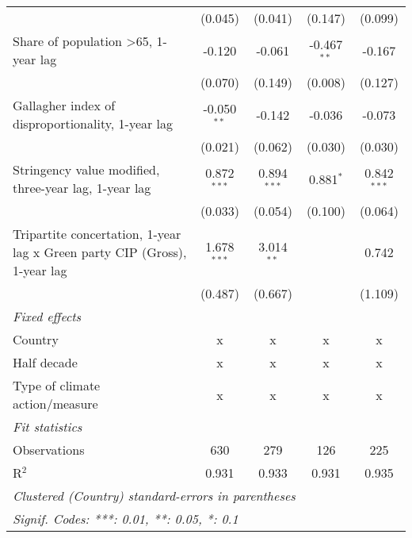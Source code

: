 \begin{table}[htbp]
\begin{tabular}{lcccc}
                                                                                & (0.045)       & (0.041)         & (0.147)         & (0.099)\\   
      Share of population >65, 1-year lag                                       & -0.120        & -0.061          & -0.467$^{**}$   & -0.167\\   
                                                                                & (0.070)       & (0.149)         & (0.008)         & (0.127)\\   
      Gallagher index of disproportionality, 1-year lag                         & -0.050$^{**}$ & -0.142          & -0.036          & -0.073\\   
                                                                                & (0.021)       & (0.062)         & (0.030)         & (0.030)\\   
      Stringency value modified, three-year lag, 1-year lag                     & 0.872$^{***}$ & 0.894$^{***}$   & 0.881$^{*}$     & 0.842$^{***}$\\   
                                                                                & (0.033)       & (0.054)         & (0.100)         & (0.064)\\   
      Tripartite concertation, 1-year lag x Green party CIP (Gross), 1-year lag & 1.678$^{***}$ & 3.014$^{**}$    &                 & 0.742\\   
                                                                                & (0.487)       & (0.667)         &                 & (1.109)\\   
      \emph{Fixed effects}\\
      Country                                                                   & x             & x               & x               & x\\  
      Half decade                                                               & x             & x               & x               & x\\  
      Type of climate action/measure                                            & x             & x               & x               & x\\  
      \midrule \emph{Fit statistics}\\
      Observations                                                              & 630           & 279             & 126             & 225\\  
      R$^2$                                                                     & 0.931         & 0.933           & 0.931           & 0.935\\  
      \midrule
      \multicolumn{5}{l}{\emph{Clustered (Country) standard-errors in parentheses}}\\
      \multicolumn{5}{l}{\emph{Signif. Codes: ***: 0.01, **: 0.05, *: 0.1}}\\
   \end{tabular}
\end{table}


